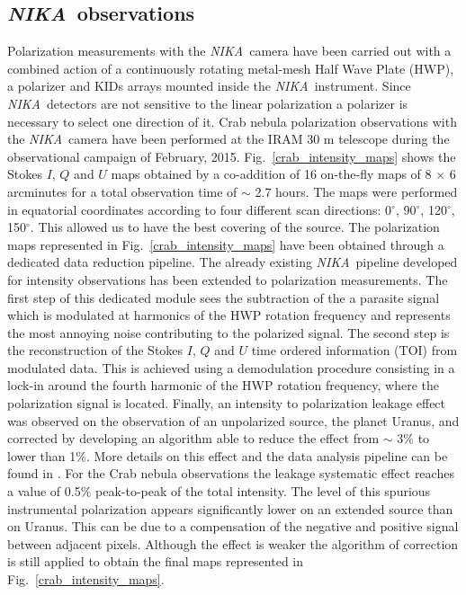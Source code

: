 \documentclass[twocolumn,traditabstract]{aa}
\def\NIKA{\textit{NIKA}}
\begin{document}
\subsection{\NIKA\ observations}\label{sec:nika_observations}
Polarization measurements with the \NIKA\ camera have been carried out with a combined action of a continuously rotating metal-mesh Half Wave Plate (HWP), a polarizer and KIDs arrays mounted inside the \NIKA\ instrument. 
Since \NIKA\ detectors \citep{roesch2012} are not sensitive to the linear polarization a polarizer is necessary to select one direction of it. 
Crab nebula polarization observations with the \NIKA\ camera have been performed at the IRAM 30 m telescope during the observational campaign of February, 2015. Fig.~\ref{crab_intensity_maps} shows the Stokes $I$, $Q$ and $U$ maps obtained by a co-addition of 16 on-the-fly maps of 8 $\times$ 6 arcminutes for a total observation time of $\sim$ 2.7 hours. The maps were performed in equatorial coordinates according to four different scan directions: 0$^{\circ}$, 90$^{\circ}$, 120$^{\circ}$, 150$^{\circ}$. This allowed us to have the best covering of the source. 
The polarization maps represented in Fig.~\ref{crab_intensity_maps} have been obtained through a dedicated data reduction pipeline. The already existing \NIKA\ pipeline \citep{catalano2014,adam2013} developed for intensity observations has been extended to polarization measurements. The first step of this dedicated module sees the subtraction of the a parasite signal which is modulated at harmonics of the HWP rotation frequency and represents the most annoying noise contributing to the polarized signal. 
The second step is the reconstruction of the Stokes $I$, $Q$ and $U$ time ordered information (TOI) from modulated data. This is achieved using a demodulation procedure consisting in a lock-in around the fourth harmonic of the HWP rotation frequency, where the polarization signal is located. Finally, an intensity to polarization leakage effect was observed on the observation of an unpolarized source, the planet Uranus, and corrected by developing an algorithm able to reduce the effect from $\sim$ 3\% to lower than 1\%. More details on this effect and the data analysis pipeline can be found in \cite{ritacco2017}.
For the Crab nebula observations the leakage systematic effect reaches a value of 0.5\% peak-to-peak of the total intensity.
The level of this spurious instrumental polarization appears significantly lower on an extended source than on Uranus. 
This can be due to a compensation of the negative and positive signal between adjacent pixels. Although the effect is weaker the algorithm of correction is still applied to obtain the final maps represented in Fig.~\ref{crab_intensity_maps}.
\end{document}
